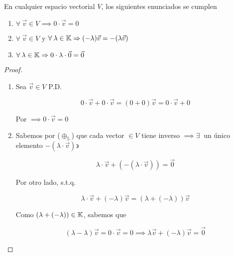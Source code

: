 \begin{theorem}\label{teo2}
    En cualquier espacio vectorial $V$, los siguientes enunciados se cumplen

    \begin{enumerate}[label=\alph*)]
        \item $\forall \: \vec{v} \in V \implies 0 \cdot \vec{v} = 0 $
        \item $\forall \: \vec{v} \in V$ y $\forall \: \lambda \in \mathbb{K}  \Rightarrow (-\lambda)\vec{v} = -(\lambda \vec{v})$
        \item $\forall \: \lambda \in \mathbb{K} \Rightarrow 0 \cdot \lambda \cdot \vec{0} = \vec{0} $
    \end{enumerate}
\end{theorem}

\begin{proof}
    \begin{enumerate}[label=\alph*)]
        \item Sea $\vec{v} \in V$ P.D. 

        \begin{equation*}
            0 \cdot \vec{v}+0 \cdot \vec{v} = (0+0)\vec{v}= 0 \cdot \vec{v}+0
        \end{equation*}

        Por  $\implies 0 \cdot \vec{v} = 0$

        \item Sabemos por (${\oplus}_{5}$) que cada vector $\in V$ tiene inverso $\implies \exists \: $ un único elemento $-(\lambda \cdot \vec{v}) \backepsilon$

        \begin{equation}
            \lambda \cdot \vec{v} + (-( \lambda \cdot \vec{v})) = \vec{0} \label{eq1}
        \end{equation}

        Por otro lado, s.t.q.

        \begin{equation*}
            \lambda \cdot \vec{v} + (-\lambda) \vec{v} = (\lambda+ (-\lambda))\vec{v}
        \end{equation*}

        Como $(\lambda+ (-\lambda)) \in \mathbb{K}$, sabemos que

        \begin{equation}
            (\lambda-\lambda)\vec{v} = 0 \cdot \vec{v} = 0 \implies \lambda \vec{v} + (-\lambda)\vec{v} = \vec{0} \label{eq2}
        \end{equation}


\end{enumerate}
\end{proof}
